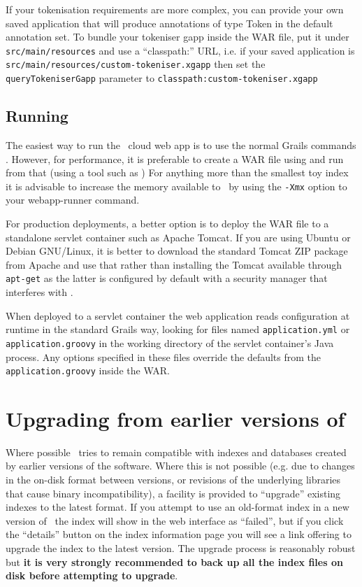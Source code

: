 If your tokenisation requirements are more complex, you can provide your own
saved application that will produce annotations of type Token in the default
annotation set.  To bundle your tokeniser gapp inside the WAR file, put it
under {\tt src/main/resources} and use a ``classpath:'' URL, i.e. if your
saved application is {\tt src/main/resources/custom-tokeniser.xgapp} then set
the {\tt queryTokeniserGapp} parameter to {\tt classpath:custom-tokeniser.xgapp}

\subsection{Running}

The easiest way to run the \Mimir\ cloud web app is to use the normal Grails
commands .  However, for performance, it is preferable
to create a WAR file using  and run from that (using a
tool such as )
For anything more than the smallest toy index it is advisable to increase the
memory available to \Mimir\ by using the {\tt -Xmx} option to your
webapp-runner command.

For production deployments, a better option is to deploy the WAR file
to a standalone servlet container such as Apache Tomcat.  If you are using
Ubuntu or Debian GNU/Linux, it is better to download the standard Tomcat ZIP
package from Apache and use that rather than installing the Tomcat available
through {\tt apt-get} as the latter is configured by default with a security
manager that interferes with \Mimir.

When deployed to a servlet container the web application reads configuration
at runtime in the standard Grails way, looking for files named
{\tt application.yml} or {\tt application.groovy} in the working directory
of the servlet container's Java process.  Any options specified in these
files override the defaults from the {\tt application.groovy} inside the WAR.

\section{Upgrading from earlier versions of \Mimir}\label{sec:admin:upgrade}

Where possible \Mimir\ tries to remain compatible with indexes and databases
created by earlier versions of the software.  Where this is not possible (e.g.
due to changes in the on-disk format between versions, or revisions of the
underlying libraries that cause binary incompatibility), a facility is provided
to ``upgrade'' existing indexes to the latest format.  If you attempt to use an
old-format index in a new version of \Mimir\ the index will show in the web
interface as ``failed'', but if you click the ``details'' button on the index
information page you will see a link offering to upgrade the index to the
latest version. The upgrade process is reasonably robust but {\bf it is very
strongly recommended to back up all the index files on disk before attempting
to upgrade}.

